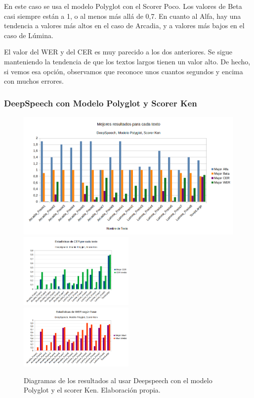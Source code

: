 En este caso se usa el modelo Polyglot con el Scorer Poco. Los valores de Beta casi siempre están a 1, o al menos más allá de 0,7. En cuanto al Alfa, hay una tendencia a valores más altos en el caso de Arcadia, y a valores más bajos en el caso de Lúmina.

El valor del WER y del CER es muy parecido a los dos anteriores. Se sigue manteniendo la tendencia de que los textos largos tienen un valor alto. De hecho, si vemos esa opción, observamos que reconoce unos cuantos segundos y encima con muchos errores.

\subsubsection{DeepSpeech con Modelo Polyglot y Scorer Ken}

\begin{figure}[H]
	\includegraphics[width=\textwidth]{imagenes/MejoresResultados_DeepSpeechIvanKenPolyglot.png} \\
	\includegraphics[width=0.5\textwidth]{imagenes/CER_DeepSpeechIvanKenPolyglot.png} \hfill \includegraphics[width=0.5\textwidth]{imagenes/WER_DeepspeechIvanKenPolyglot.png}
	\caption[Diagramas de Alfa, Beta, WER y CER - Polyglot y Ken]{Diagramas de los resultados al usar Deepspeech con el modelo Polyglot y el scorer Ken. Elaboración propia.}
\end{figure}

